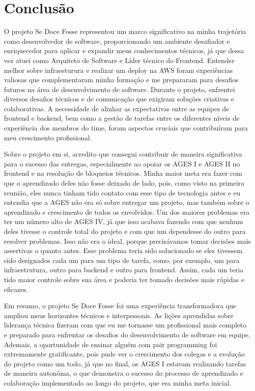 \section[Conclusão]{Conclusão}

O projeto Se Doce Fosse representou um marco significativo na minha trajetória como desenvolvedor de software, proporcionando um ambiente desafiador e enriquecedor para aplicar e expandir meus conhecimentos técnicos, já que dessa vez atuei como Arquiteto de Software e Líder técnico do Frontend. Entender melhor sobre infraesturura e realizar um deploy na AWS foram experiências valiosas que complementaram minha formação e me prepararam para desafios futuros na área de desenvolvimento de software. Durante o projeto, enfrentei diversos desafios técnicos e de comunicação que exigiram soluções criativas e colaborativas. A necessidade de alinhar as expectativas entre as equipes de frontend e backend, bem como a gestão de tarefas entre os diferentes níveis de experiência dos membros do time, foram aspectos cruciais que contribuíram para meu crescimento profissional.
\par Sobre o projeto em si, acredito que consegui contribuir de maneira significativa para o sucesso das entregas, especialmente ao apoiar os AGES I e AGES II no frontend e na resolução de bloqueios técnicos. Minha maior meta era fazer com que o aprendizado deles não fosse deixado de lado, pois, como visto na primeira reunião, eles nunca tinham tido contato com esse tipo de tecnologia antes e eu entendia que a AGES não era só sobre entregar um projeto, mas também sobre o aprendizado e crescimento de todos os envolvidos. Um dos maiores problemas era ter um número alto de AGES IV, já que isso acabava fazendo com que nenhum deles tivesse o controle total do projeto e com que um dependesse do outro para resolver problemas. Isso não era o ideal, porque precisávamos tomar decisões mais assertivas o quanto antes. Esse problema teria sido solucionado se eles tivessem sido designados cada um para um tipo de tarefa, como, por exemplo, um para infraestrutura, outro para backend e outro para frontend. Assim, cada um teria tido maior controle sobre sua área e poderia ter tomado decisões mais rápidas e eficazes.
\par Em resumo, o projeto Se Doce Fosse foi uma experiência transformadora que ampliou meus horizontes técnicos e interpessoais. As lições aprendidas sobre liderança técnica fizeram com que eu me tornasse um profissional mais completo e preparado para enfrentar os desafios do desenvolvimento de software em equipe. Ademais, a oportunidade de ensinar alguém com pair programming foi extremamente gratificante, pois pude ver o crescimento dos colegas e a evolução do projeto como um todo, já que no final, os AGES I estavam realizando tarefas de maneira autonôma, o que demonstra o sucesso do processo de aprendizado e colaboração implementado ao longo do projeto, que era minha meta inicial.
